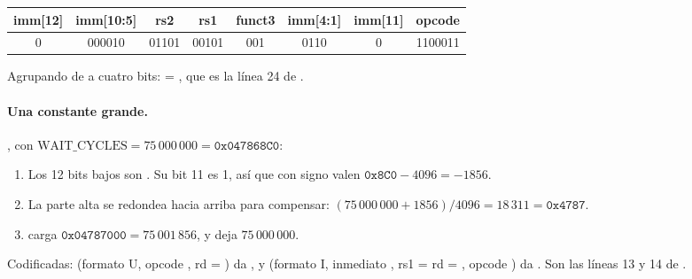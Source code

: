 \begin{table}[H]
\centering
\small
\begin{tabular}{|c|c|c|c|c|c|c|c|}
\hline
imm[12] & imm[10:5] & rs2 & rs1 & funct3 & imm[4:1] & imm[11] & opcode \\
\hline
0 & 000010 & 01101 & 00101 & 001 & 0110 & 0 & 1100011 \\
\hline
\end{tabular}
\end{table}

Agrupando de a cuatro bits:
 = , que es la línea 24
de .

\paragraph{Una constante grande.} , con
$\text{WAIT\_CYCLES} = 75\,000\,000 = \texttt{0x047868C0}$:

\begin{enumerate}
  \item Los 12 bits bajos son . Su bit 11 es 1, así que con signo valen
        $\texttt{0x8C0} - 4096 = -1856$.
  \item La parte alta se redondea hacia arriba para compensar:
        $(75\,000\,000 + 1856) / 4096 = 18\,311 = \texttt{0x4787}$.
  \item {} carga $\texttt{0x04787000} = 75\,001\,856$, y
         deja $75\,000\,000$.
\end{enumerate}

Codificadas:  (formato U, opcode , rd = ) da
, y  (formato I, inmediato , rs1 = rd =
, opcode ) da . Son las líneas 13 y 14 de
.
